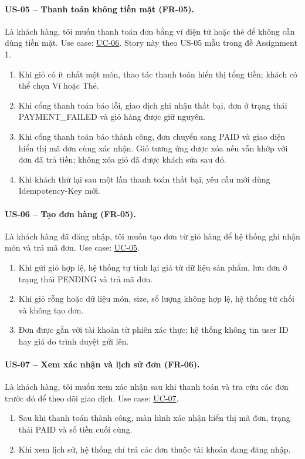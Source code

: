 \paragraph{US-05 -- Thanh toán không tiền mặt (FR-05).}
Là khách hàng, tôi muốn thanh toán đơn bằng ví điện tử hoặc thẻ để không cần dùng tiền mặt. Use case: \hyperref[uc06]{UC-06}. Story này theo US-05 mẫu trong đề Assignment 1.
\begin{enumerate}[label=\textbf{AC\arabic*:},leftmargin=*]
  \item Khi giỏ có ít nhất một món, thao tác thanh toán hiển thị tổng tiền; khách có thể chọn Ví hoặc Thẻ.
  \item Khi cổng thanh toán báo lỗi, giao dịch ghi nhận thất bại, đơn ở trạng thái PAYMENT\_FAILED và giỏ hàng được giữ nguyên.
  \item Khi cổng thanh toán báo thành công, đơn chuyển sang PAID và giao diện hiển thị mã đơn cùng xác nhận. Giỏ tương ứng được xóa nếu vẫn khớp với đơn đã trả tiền; không xóa giỏ đã được khách sửa sau đó.
  \item Khi khách thử lại sau một lần thanh toán thất bại, yêu cầu mới dùng Idempotency-Key mới.
\end{enumerate}

\paragraph{US-06 -- Tạo đơn hàng (FR-05).}
Là khách hàng đã đăng nhập, tôi muốn tạo đơn từ giỏ hàng để hệ thống ghi nhận món và trả mã đơn. Use case: \hyperref[uc05]{UC-05}.
\begin{enumerate}[label=\textbf{AC\arabic*:},leftmargin=*]
  \item Khi gửi giỏ hợp lệ, hệ thống tự tính lại giá từ dữ liệu sản phẩm, lưu đơn ở trạng thái PENDING và trả mã đơn.
  \item Khi giỏ rỗng hoặc dữ liệu món, size, số lượng không hợp lệ, hệ thống từ chối và không tạo đơn.
  \item Đơn được gắn với tài khoản từ phiên xác thực; hệ thống không tin user ID hay giá do trình duyệt gửi lên.
\end{enumerate}

\paragraph{US-07 -- Xem xác nhận và lịch sử đơn (FR-06).}
Là khách hàng, tôi muốn xem xác nhận sau khi thanh toán và tra cứu các đơn trước đó để theo dõi giao dịch. Use case: \hyperref[uc07]{UC-07}.
\begin{enumerate}[label=\textbf{AC\arabic*:},leftmargin=*]
  \item Sau khi thanh toán thành công, màn hình xác nhận hiển thị mã đơn, trạng thái PAID và số tiền cuối cùng.
  \item Khi xem lịch sử, hệ thống chỉ trả các đơn thuộc tài khoản đang đăng nhập.
\end{enumerate}

